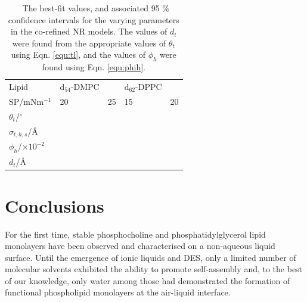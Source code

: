 \documentclass[twoside,twocolumn,9pt]{article}
\begin{document}
\begin{table}
	\small
	\caption{\ The best-fit values, and associated 95 \% confidence intervals for the varying parameters in the co-refined NR models. The values of $d_t$ were found from the appropriate values of $\theta_t$ using Eqn. \ref{equ:tl}, and the values of $\phi_h$ were found using Eqn. \ref{equ:phih}.}
	\label{tab:neutron}
	\begin{tabular*}{0.48\textwidth}{@{\extracolsep{\fill}}lllll}
		\hline
		Lipid & d$_{54}$-DMPC & & d$_{62}$-DPPC & \\
    SP/mNm$^{-1}$ & 20 & 25 & 15 & 20 \\
		\hline
		$\theta_t$/$^\circ$ &  &  &  &  \\
		$\sigma_{t,h,s}$/\AA &  &  &  &  \\
    \hline
    $\phi_h$/$\times10^{-2}$ &  &  &  &  \\
		$d_t$/\AA &  &  &  &  \\
		\hline
	\end{tabular*}
\end{table}
%

\section{Conclusions}

For the first time, stable phosphocholine and phosphatidylglycerol lipid monolayers have been observed and characterised on a non-aqueous liquid surface. Until the emergence of ionic liquids and DES, only a limited number of molecular solvents exhibited the ability to promote self-assembly and, to the best of our knowledge, only water among those had demonstrated the formation of functional phospholipid monolayers at the air-liquid interface.
\end{document}
